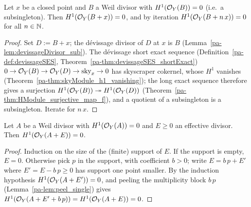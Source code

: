 \begin{lemma}
  \label{pa-lem:peel_single}
  \leanok

  Let \(x\) be a closed point and \(B\) a Weil divisor with
  \(H^1(\mathcal{O}_{Y}(B)) = 0\) (i.e.\ a subsingleton). Then
  \(H^1(\mathcal{O}_{Y}(B + x)) = 0\), and by iteration
  \(H^1(\mathcal{O}_{Y}(B + n\,x)) = 0\) for all \(n \in \mathbb{N}\).
\end{lemma}
\begin{proof}
  \leanok
  Set \(D := B + x\); the d\'evissage divisor of \(D\) at \(x\) is \(B\)
  (Lemma~\ref{pa-lem:devissageDivisor_sub}). The d\'evissage short exact sequence
  (Definition~\ref{pa-def:devissageSES}, Theorem~\ref{pa-thm:devissageSES_shortExact})
  \(0 \to \mathcal{O}_{Y}(B) \to \mathcal{O}_{Y}(D) \to \mathrm{sky}_x \to 0\) has skyscraper cokernel,
  whose \(H^1\) vanishes (Theorem~\ref{pa-thm:skyModule_h1_vanishing}); the long exact
  sequence therefore gives a surjection \(H^1(\mathcal{O}_{Y}(B)) \twoheadrightarrow
  H^1(\mathcal{O}_{Y}(D))\) (Theorem~\ref{pa-thm:HModule_surjective_map_f}), and a quotient of a
  subsingleton is a subsingleton. Iterate for \(n\,x\).
\end{proof}

\begin{lemma}
  \label{pa-lem:peel_effective}
  \leanok

  Let \(A\) be a Weil divisor with \(H^1(\mathcal{O}_{Y}(A)) = 0\) and \(E \ge 0\) an effective
  divisor. Then \(H^1(\mathcal{O}_{Y}(A + E)) = 0\).
\end{lemma}
\begin{proof}
  \leanok
  Induction on the size of the (finite) support of \(E\). If the support is empty, \(E = 0\).
  Otherwise pick \(p\) in the support, with coefficient \(b > 0\); write
  \(E = b\,p + E'\) where \(E' = E - b\,p \ge 0\) has support one point smaller. By the
  induction hypothesis \(H^1(\mathcal{O}_{Y}(A + E')) = 0\), and peeling the multiplicity block
  \(b \, p\) (Lemma~\ref{pa-lem:peel_single}) gives \(H^1(\mathcal{O}_{Y}(A + E' + b\,p)) =
  H^1(\mathcal{O}_{Y}(A + E)) = 0\).
\end{proof}

